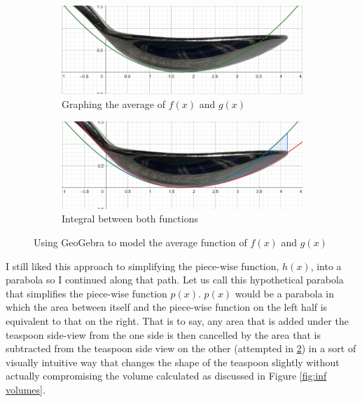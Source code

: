 \documentclass[12pt]{article}
\begin{document}
\begin{figure}[h]
     \centering
     \begin{subfigure}[b]{0.45\textwidth}
         \centering
         \includegraphics[width=\textwidth]{images/avg parab.png}
         \caption{Graphing the average of $f(x)$ and $g(x)$}
         \label{fig:avg.parab}
     \end{subfigure}
     \hfill
     \begin{subfigure}[b]{0.45\textwidth}
         \centering
         \includegraphics[width=\textwidth]{images/uneq area.png}
         \caption{Integral between both functions}
         \label{fig:skill-issue}
     \end{subfigure}
     \hfill
        \caption{Using GeoGebra to model the average function of $f(x)$ and $g(x)$}
        \label{fig:avg problem}
\end{figure}

\pagebreak

I still liked this approach to simplifying the piece-wise function, $h(x)$, into a parabola so I continued along that path. Let us call this hypothetical parabola that simplifies the piece-wise function $p(x)$. $p(x)$ would be a parabola in which the area between itself and the piece-wise function on the left half is equivalent to that on the right. That is to say, any area that is added under the teaspoon side-view from the one side is then cancelled by the area that is subtracted from the teaspoon side view on the other (attempted in \ref{fig:skill-issue}) in a sort of visually intuitive way that changes the shape of the teaspoon slightly without actually compromising the volume calculated as discussed in Figure \ref{fig:inf volumes}.
\end{document}
